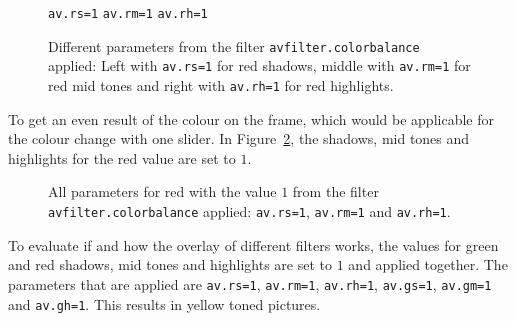 \documentclass[../MasterThesis.tex]{subfiles}
\begin{document}
\begin{figure}[H]
	\begin{center}
		\small{
		\texttt{av.rs=1} \hspace*{0.22\textwidth} \texttt{av.rm=1} \hspace*{0.23\textwidth} \texttt{av.rh=1}}
		\caption[Different parameters from the filter \texttt{avfilter.colorbalance} applied.]{Different parameters from the filter \texttt{avfilter.colorbalance} applied: Left with \texttt{av.rs=1} for red shadows, middle with \texttt{av.rm=1} for red mid tones and right with \texttt{av.rh=1} for red highlights.}
			\label{figure:rs1rm1rh1}
	\end{center}
\end{figure}

To get an even result of the colour on the frame, which would be applicable for the colour change with one slider. In Figure~\ref{figure:rsrmrh1}, the shadows, mid tones and highlights for the red value are set to $1$. 

\begin{figure}[H]
	\begin{center}
		\label{figure:rsrmrh1}
		\caption[Parameters set to $1$ for red using the \texttt{avfilter.colorbalance} filter.]{All parameters for red with the value $1$  from the filter \texttt{avfilter.colorbalance} applied: \texttt{av.rs=1}, \texttt{av.rm=1} and \texttt{av.rh=1}.}
	\end{center}
\end{figure}

To evaluate if and how the overlay of different filters works, the values for green and red shadows, mid tones and highlights are set to $1$ and applied together. The parameters that are applied are \texttt{av.rs=1}, \texttt{av.rm=1}, \texttt{av.rh=1}, \texttt{av.gs=1}, \texttt{av.gm=1} and \texttt{av.gh=1}.
This results in yellow toned pictures.
\end{document}
